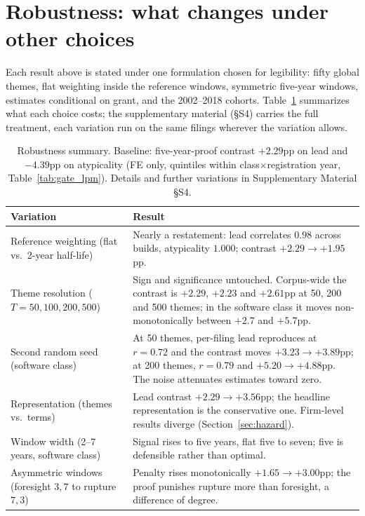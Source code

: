 \section{Robustness: what changes under other choices}\label{sec:robust}

Each result above is stated under one formulation chosen for legibility:
fifty global themes, flat weighting inside the reference windows,
symmetric five-year windows, estimates conditional on grant, and the
2002--2018 cohorts. Table~\ref{tab:robust} summarizes what each choice
costs; the supplementary material (\S S4) carries the full treatment,
each variation run on the same filings wherever the variation allows.

\begin{table}[!htbp]\centering\small
\caption{Robustness summary. Baseline: five-year-proof contrast
$+2.29$pp on lead and $-4.39$pp on atypicality (FE only, quintiles
within class$\times$registration year, Table~\ref{tab:gate_lpm}).
Details and further variations in Supplementary Material \S S4.}
\label{tab:robust}
\begin{tabular}{p{5.6cm}p{7.6cm}}
\toprule
Variation & Result \\
\midrule
Reference weighting (flat vs.\ 2-year half-life) & Nearly a restatement: lead correlates $0.98$ across builds, atypicality $1.000$; contrast $+2.29 \to +1.95$pp. \\
Theme resolution ($T = 50, 100, 200, 500$) & Sign and significance untouched. Corpus-wide the contrast is $+2.29$, $+2.23$ and $+2.61$pp at 50, 200 and 500 themes; in the software class it moves non-monotonically between $+2.7$ and $+5.7$pp. \\
Second random seed (software class) & At 50 themes, per-filing lead reproduces at $r = 0.72$ and the contrast moves $+3.23 \to +3.89$pp; at 200 themes, $r = 0.79$ and $+5.20 \to +4.88$pp. The noise attenuates estimates toward zero. \\
Representation (themes vs.\ terms) & Lead contrast $+2.29 \to +3.56$pp; the headline representation is the conservative one. Firm-level results diverge (Section~\ref{sec:hazard}). \\
Window width (2--7 years, software class) & Signal rises to five years, flat five to seven; five is defensible rather than optimal. \\
Asymmetric windows (foresight $3{,}7$ to rupture $7{,}3$) & Penalty rises monotonically $+1.65 \to +3.00$pp; the proof punishes rupture more than foresight, a difference of degree. \\

\end{tabular}
\end{table}
